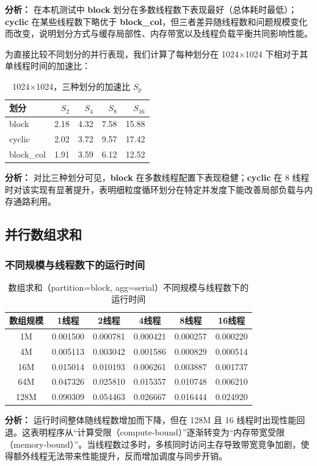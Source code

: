 \documentclass{SYSUReport}
\begin{document}
\textbf{分析：} 在本机测试中 \textbf{block} 划分在多数线程数下表现最好（总体耗时最低）；\textbf{cyclic} 在某些线程数下略优于 \textbf{block\_col}，但三者差异随线程数和问题规模变化而改变，说明划分方式与缓存局部性、内存带宽以及线程负载平衡共同影响性能。

为直接比较不同划分的并行表现，我们计算了每种划分在 1024×1024 下相对于其单线程时间的加速比：
\begin{table}[H]
\centering
\caption{1024×1024，三种划分的加速比 $S_p$}
\begin{tabular}{lrrrr}
\toprule
划分 & $S_2$ & $S_4$ & $S_8$ & $S_{16}$ \\
\midrule
block      & 2.18 & 4.32 & 7.58  & 15.88 \\
cyclic     & 2.02 & 3.72 & 9.57  & 17.42 \\
block\_col & 1.91 & 3.59 & 6.12  & 12.52 \\
\bottomrule
\end{tabular}
\end{table}

\textbf{分析：} 对比三种划分可见，\textbf{block} 在多数线程配置下表现稳健；\textbf{cyclic} 在 8 线程时对该实现有显著提升，表明细粒度循环划分在特定并发度下能改善局部负载与内存通路利用。



\subsection{并行数组求和}

\subsubsection{不同规模与线程数下的运行时间}

\begin{table}[h]
\centering
\caption{数组求和（partition=block, agg=serial）不同规模与线程数下的运行时间}
\begin{tabular}{cccccc}
\toprule
数组规模 & 1线程 & 2线程 & 4线程 & 8线程 & 16线程 \\
\midrule
1M & 0.001500 & 0.000781 & 0.000421 & 0.000257 & 0.000220 \\
4M & 0.005113 & 0.003042 & 0.001586 & 0.000829 & 0.000514 \\
16M & 0.015014 & 0.010193 & 0.006261 & 0.003887 & 0.001737 \\
64M & 0.047326 & 0.025810 & 0.015357 & 0.010748 & 0.006210 \\
128M & 0.090309 & 0.054463 & 0.026667 & 0.016444 & 0.024920 \\
\bottomrule
\end{tabular}
\end{table}
\textbf{分析：} 运行时间整体随线程数增加而下降，但在 128M 且 16 线程时出现性能回退。这表明程序从“计算受限（compute-bound）”逐渐转变为“内存带宽受限（memory-bound）”。当线程数过多时，多核同时访问主存导致带宽竞争加剧，使得额外线程无法带来性能提升，反而增加调度与同步开销。
\end{document}
